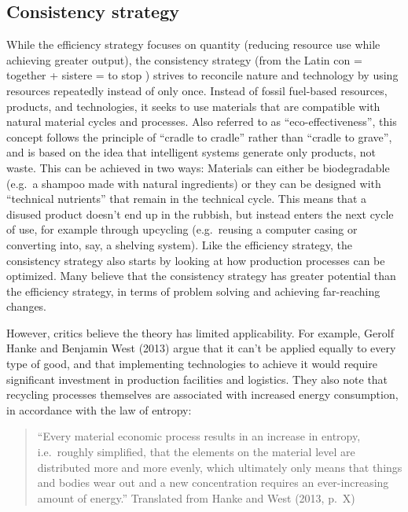 \documentclass[
  a4paper,
  openany]{book}
\begin{document}
\subsection{Consistency strategy}\label{consistency-strategy}

While the efficiency strategy focuses on quantity (reducing resource use
while achieving greater output), the consistency strategy (from the
Latin con = together + sistere = to stop ) strives to reconcile nature
and technology by using resources repeatedly instead of only once.
Instead of fossil fuel-based resources, products, and technologies, it
seeks to use materials that are compatible with natural material cycles
and processes. Also referred to as ``eco-effectiveness'', this concept
follows the principle of ``cradle to cradle'' rather than ``cradle to
grave'', and is based on the idea that intelligent systems generate only
products, not waste. This can be achieved in two ways: Materials can
either be biodegradable (e.g.~a shampoo made with natural ingredients)
or they can be designed with ``technical nutrients'' that remain in the
technical cycle. This means that a disused product doesn't end up in the
rubbish, but instead enters the next cycle of use, for example through
upcycling (e.g.~reusing a computer casing or converting into, say, a
shelving system). Like the efficiency strategy, the consistency strategy
also starts by looking at how production processes can be optimized.
Many believe that the consistency strategy has greater potential than
the efficiency strategy, in terms of problem solving and achieving
far-reaching changes.

However, critics believe the theory has limited applicability. For
example, Gerolf Hanke and Benjamin West (2013) argue that it can't be
applied equally to every type of good, and that implementing
technologies to achieve it would require significant investment in
production facilities and logistics. They also note that recycling
processes themselves are associated with increased energy consumption,
in accordance with the law of entropy:

\begin{quote}
``Every material economic process results in an increase in entropy,
i.e.~roughly simplified, that the elements on the material level are
distributed more and more evenly, which ultimately only means that
things and bodies wear out and a new concentration requires an
ever-increasing amount of energy.'' Translated from Hanke and West
(2013, p.~X)
\end{quote}
\end{document}
